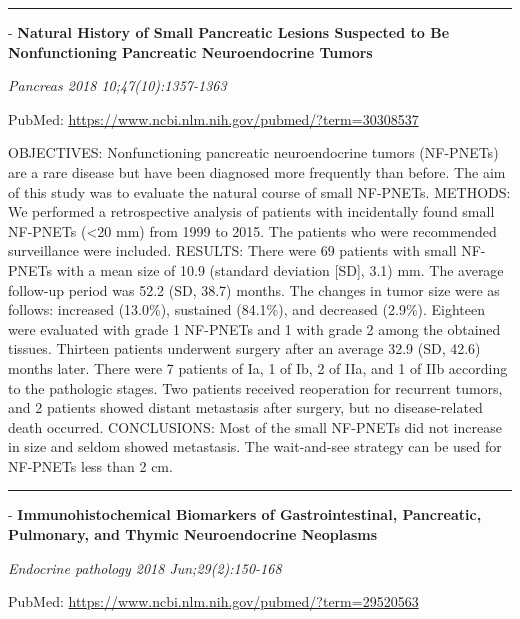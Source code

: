 \documentclass[]{article}
\begin{document}
{}

{}

\begin{center}\rule{0.5\linewidth}{\linethickness}\end{center}

 - \textbf{Natural History of Small Pancreatic Lesions Suspected to Be
Nonfunctioning Pancreatic Neuroendocrine Tumors}

\emph{Pancreas 2018 10;47(10):1357-1363}

PubMed: \url{https://www.ncbi.nlm.nih.gov/pubmed/?term=30308537}

OBJECTIVES: Nonfunctioning pancreatic neuroendocrine tumors (NF-PNETs)
are a rare disease but have been diagnosed more frequently than before.
The aim of this study was to evaluate the natural course of small
NF-PNETs. METHODS: We performed a retrospective analysis of patients
with incidentally found small NF-PNETs (\textless{}20 mm) from 1999 to
2015. The patients who were recommended surveillance were included.
RESULTS: There were 69 patients with small NF-PNETs with a mean size of
10.9 (standard deviation {[}SD{]}, 3.1) mm. The average follow-up period
was 52.2 (SD, 38.7) months. The changes in tumor size were as follows:
increased (13.0\%), sustained (84.1\%), and decreased (2.9\%). Eighteen
were evaluated with grade 1 NF-PNETs and 1 with grade 2 among the
obtained tissues. Thirteen patients underwent surgery after an average
32.9 (SD, 42.6) months later. There were 7 patients of Ia, 1 of Ib, 2 of
IIa, and 1 of IIb according to the pathologic stages. Two patients
received reoperation for recurrent tumors, and 2 patients showed distant
metastasis after surgery, but no disease-related death occurred.
CONCLUSIONS: Most of the small NF-PNETs did not increase in size and
seldom showed metastasis. The wait-and-see strategy can be used for
NF-PNETs less than 2 cm.

{}

{}

\begin{center}\rule{0.5\linewidth}{\linethickness}\end{center}

 - \textbf{Immunohistochemical Biomarkers of Gastrointestinal,
Pancreatic, Pulmonary, and Thymic Neuroendocrine Neoplasms}

\emph{Endocrine pathology 2018 Jun;29(2):150-168}

PubMed: \url{https://www.ncbi.nlm.nih.gov/pubmed/?term=29520563}
\end{document}
